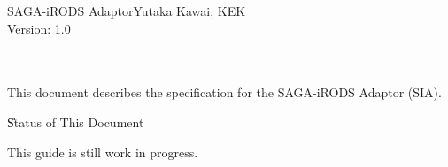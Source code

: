 
\newcommand{\sagadocument}{SAGA-iRODS Adaptor}
\newcommand{\sagaversion}{1.0}
\newcommand{\sagabasename}{saga-irods-spec}
\newcommand{\sagaemail}{yutaka.kawai@kek.jp}




\newcommand{\name}{\F{SAGA}\xspace}
\DefineShortVerb{\|}



 \thispagestyle{empty}

 \sagadocument{}\hfill  Yutaka Kawai, KEK\\
  Version: \sagaversion \hfill {\sagadate}


  \hrulefill\\[2em]

  \\[4em]





   This document describes the specification for the SAGA-iRODS Adaptor (SIA).
   

   
   
  \U{Status of This Document}

  This guide is still work in progress.\\

  \newpage

  \tableofcontents

  \newpage

%                                        
%
%
%
%
%
%

%
%
%
%




